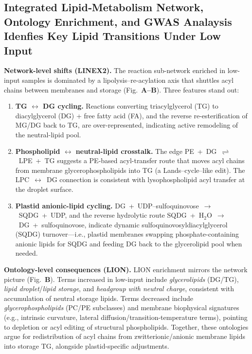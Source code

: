 \documentclass[10pt,letterpaper]{article}
\begin{document}
\subsection*{Integrated Lipid‐Metabolism Network, Ontology Enrichment, and GWAS Analaysis Idenfies Key Lipid Transitions Under Low Input}


\noindent \textbf{Network-level shifts (LINEX2).}
The reaction sub-network enriched in low-input samples is dominated by a lipolysis–re-acylation axis that shuttles acyl chains between membranes and storage (Fig.\ \textbf{A–B}). Three features stand out:
\begin{enumerate}\itemsep3pt
  \item \textbf{TG $\leftrightarrow$ DG cycling.} Reactions converting triacylglycerol (TG) to diacylglycerol (DG) {+} free fatty acid (FA), and the reverse re-esterification of MG/DG back to TG, are over-represented, indicating active remodeling of the neutral-lipid pool.
  \item \textbf{Phospholipid $\leftrightarrow$ neutral-lipid crosstalk.} The edge \mbox{PE + DG $\rightleftharpoons$ LPE + TG} suggests a PE-based acyl-transfer route that moves acyl chains from membrane glycerophospholipids into TG (a Lands–cycle–like edit). The \mbox{LPC $\leftrightarrow$ DG} connection is consistent with lysophospholipid acyl transfer at the droplet surface.
  \item \textbf{Plastid anionic-lipid cycling.} \mbox{DG + UDP–sulfoquinovose $\rightarrow$ SQDG + UDP}, and the reverse hydrolytic route \mbox{SQDG + H$_2$O $\rightarrow$ DG + sulfoquinovose}, indicate dynamic sulfoquinovosyldiacylglycerol (SQDG) turnover—i.e., plastid membranes swapping phosphate-containing anionic lipids for SQDG and feeding DG back to the glycerolipid pool when needed.
\end{enumerate}

\noindent \textbf{Ontology-level consequences (LION).}
LION enrichment mirrors the network picture (Fig.\ \textbf{B}). Terms increased in low-input include \emph{glycerolipids} (DG/TG), \emph{lipid droplet}/\emph{lipid storage}, and \emph{headgroup with neutral charge}, consistent with accumulation of neutral storage lipids. Terms decreased include \emph{glycerophospholipids} (PC/PE subclasses) and membrane biophysical signatures (e.g., intrinsic curvature, lateral diffusion/transition-temperature terms), pointing to depletion or acyl editing of structural phospholipids. Together, these ontologies argue for redistribution of acyl chains from zwitterionic/anionic membrane lipids into storage TG, alongside plastid-specific adjustments.
\end{document}
